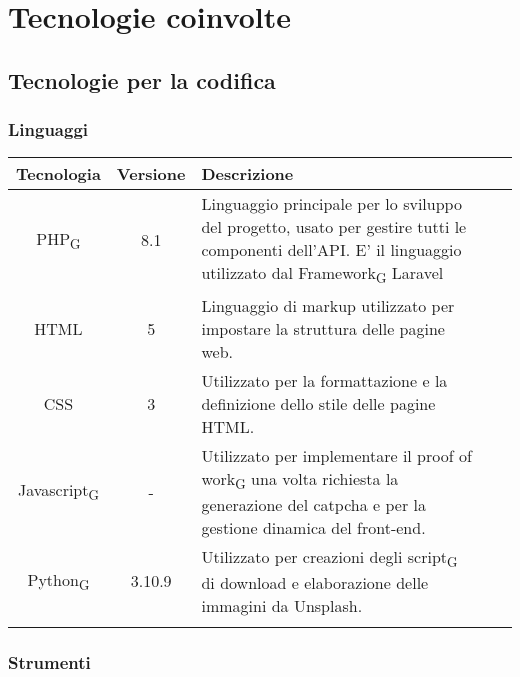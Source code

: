 \section{Tecnologie coinvolte}

\subsection{Tecnologie per la codifica}

\subsubsection{Linguaggi}

\begin{center}
\setlength\extrarowheight{5pt}
\renewcommand\tabularxcolumn[1]{>{\Centering}m{#1}}
\begin{tabularx}{\textwidth}{| c | c | X | X | X |} 
	\hline
	\rowcolor{white}
	\textbf{Tecnologia} & \textbf{Versione} & \textbf{Descrizione}\\
	\hline
	PHP\textsubscript{G} & 8.1 & Linguaggio principale per lo sviluppo del progetto, usato per gestire tutti le componenti dell'API. E' il linguaggio utilizzato dal Framework\textsubscript{G} Laravel\\
	\hline
	HTML & 5 & Linguaggio di markup utilizzato per impostare la struttura delle pagine web.\\
	\hline
	CSS & 3 & Utilizzato per la formattazione e la definizione dello stile delle pagine HTML.\\
	\hline
	Javascript\textsubscript{G} & - & Utilizzato per implementare il proof of work\textsubscript{G} una volta richiesta la generazione del catpcha e per la gestione dinamica del front-end.\\
	\hline
	Python\textsubscript{G} & 3.10.9 & Utilizzato per creazioni degli script\textsubscript{G} di download e elaborazione delle immagini da Unsplash.\\
	\hline
	\rowcolor{white}
	\caption{Linguaggi utilizzati}
\end{tabularx}
\end{center}

\subsubsection{Strumenti}

